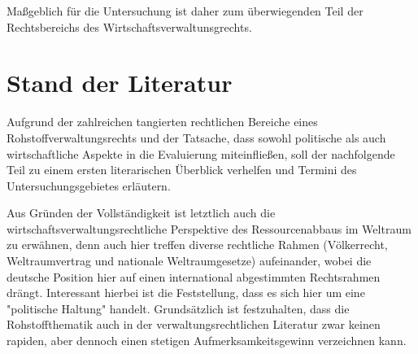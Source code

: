 \documentclass[12pt,a4paper,oneside]{book} %
\begin{document}
Maßgeblich für die Untersuchung ist daher zum überwiegenden Teil der Rechtsbereichs des Wirtschaftsverwaltunsgrechts.


\section{Stand der Literatur}
Aufgrund der zahlreichen tangierten rechtlichen Bereiche eines Rohstoffverwaltungsrechts und der Tatsache, dass sowohl politische als auch wirtschaftliche Aspekte in die Evaluierung miteinfließen, soll der nachfolgende Teil zu einem ersten literarischen Überblick verhelfen und Termini des Untersuchungsgebietes erläutern.


Aus Gründen der Vollständigkeit ist letztlich auch die wirtschaftsverwaltungsrechtliche Perspektive des Ressourcenabbaus im Weltraum zu erwähnen, denn auch hier treffen diverse rechtliche Rahmen (Völkerrecht, Weltraumvertrag und nationale Weltraumgesetze) aufeinander, wobei die deutsche Position hier auf einen international abgestimmten Rechtsrahmen drängt. Interessant hierbei ist die Feststellung, dass es sich hier um eine "politische Haltung" handelt.
Grundsätzlich ist festzuhalten, dass die Rohstoffthematik auch in der verwaltungsrechtlichen Literatur zwar keinen rapiden, aber dennoch einen stetigen Aufmerksamkeitsgewinn verzeichnen kann.
\end{document}
